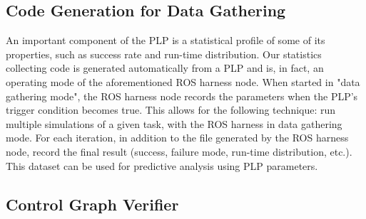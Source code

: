 \documentclass[ 5p, 12pt, times, twocolumn, sort&compress ]{elsarticle}
\begin{document}
\subsection{Code Generation for Data Gathering}
An important component of the PLP is a statistical profile of some of its properties, such as success rate and run-time distribution.
 Our statistics collecting code is generated automatically from a PLP and is, in fact,
an operating mode of the aforementioned ROS harness node. When started in "data gathering mode", the ROS harness node records the parameters when the PLP's trigger condition becomes true. This allows for the following technique: run multiple simulations of a given task, with the ROS harness in data gathering mode. For each iteration, in addition to the file generated by the ROS harness node, record the final result (success, failure mode, run-time distribution, etc.). This
dataset can be used for predictive analysis using PLP parameters.

\subsection{Control Graph Verifier}

\end{document}
